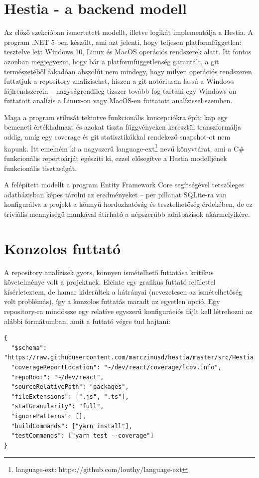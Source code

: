 \section{Hestia - a backend modell}

Az előző szekcióban ismertetett modellt, illetve logikát implementálja a Hestia. A program .NET 5-ben készült, ami azt jelenti, hogy teljesen platformfüggetlen: tesztelve lett Windows 10, Linux és MacOS operációs rendszerek alatt. Itt fontos azonban megjegyezni, hogy bár a platformfüggetlenség garantált, a git természetéből fakadóan abszolút nem mindegy, hogy milyen operációs rendszeren futtatjuk a repository analíziseket, hiszen a git notóriusan lassú a Windows fájlrendszerein -- nagyságrendileg tízszer tovább fog tartani egy Windows-on futtatott analízis a Linux-on vagy MacOS-en futtatott analízissel szemben.

Maga a program stílusát tekintve funkcionális koncepciókra épít: kap egy bemeneti értékhalmazt és azokat tiszta függvényeken keresztül transzformálja addig, amíg egy coverage és git statisztikákkal rendekező snapshot-ot nem kapunk. Itt emelném ki a nagyszerű language-ext\footnote{language-ext: https://github.com/louthy/language-ext} nevű könyvtárat, ami a C\# funkcionális repertoárját egészíti ki, ezzel elősegítve a Hestia modelljének funkcionális tisztaságát.

A felépített modellt a program Entity Framework Core segítségével tetszőleges adatbázisban képes tárolni az eredményeket -- per pillanat SQLite-ra van konfigurálva a projekt a könnyű hordozhatóság és tesztelhetőség érdekében, de ez triviális mennyiségű munkával átírható a népszerűbb adatbázisok akármelyikére.

\section{Konzolos futtató}

A repository analízisek gyors, könnyen ismételhető futtatása kritikus követelménye volt a projektnek. Eleinte egy grafikus futtató felülettel kísérleteztem, de hamar kiderültek a hátrányai (nevezetesen az ismételhetőség volt problémás), így a konzolos futtatás maradt az egyetlen opció. Egy repository-ra mindössze egy relatíve egyszerű konfigurációs fájlt kell létrehozni az alábbi formátumban, amit a futtató végre tud hajtani:

\begin{lstlisting}
{
  "$schema": "https://raw.githubusercontent.com/marczinusd/hestia/master/src/Hestia.ConsoleRunner/config.schema.json",
  "coverageReportLocation": "~/dev/react/coverage/lcov.info",
  "repoRoot": "~/dev/react",
  "sourceRelativePath": "packages",
  "fileExtensions": [".js", ".ts"],
  "statGranularity": "full",
  "ignorePatterns": [],
  "buildCommands": ["yarn install"],
  "testCommands": ["yarn test --coverage"]
}
\end{lstlisting}

